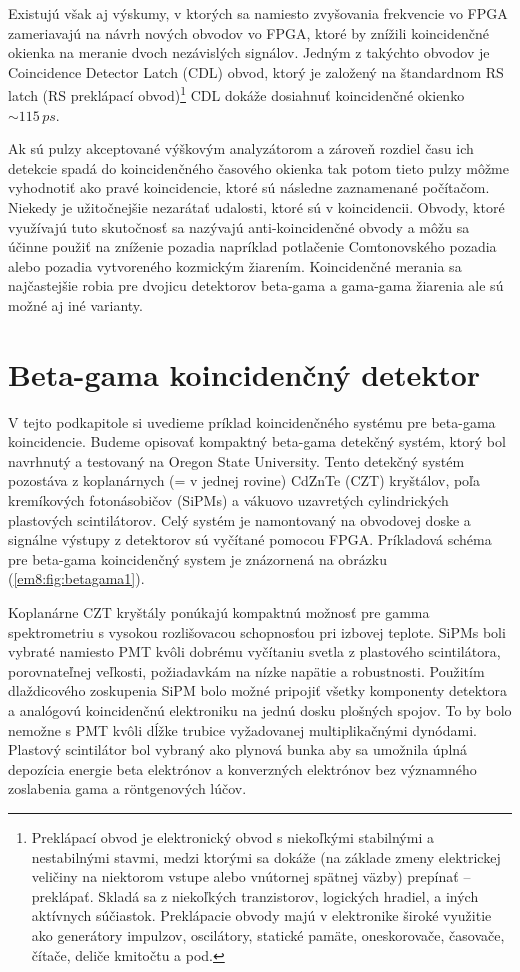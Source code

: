 \documentclass[../../main.tex]{subfiles}
\begin{document}
Existujú však aj výskumy, v ktorých sa namiesto zvyšovania frekvencie vo FPGA zameriavajú na návrh nových obvodov vo FPGA, ktoré by znížili koincidenčné okienka na meranie dvoch nezávislých signálov. Jedným z takýchto obvodov je Coincidence Detector Latch (CDL) obvod, ktorý je založený na štandardnom RS latch (RS preklápací obvod)\footnote{Preklápací obvod je elektronický obvod s niekoľkými stabilnými a nestabilnými stavmi, medzi ktorými sa dokáže (na základe zmeny elektrickej veličiny na niektorom vstupe alebo vnútornej spätnej väzby) prepínať – preklápať. Skladá sa z niekoľkých tranzistorov, logických hradiel, a iných aktívnych súčiastok. Preklápacie obvody majú v elektronike široké využitie ako generátory impulzov, oscilátory, statické pamäte, oneskorovače, časovače, čítače, deliče kmitočtu a pod.} CDL dokáže dosiahnuť koincidenčné okienko $\sim 115\,ps$.

Ak sú pulzy akceptované výškovým analyzátorom a zároveň rozdiel času ich detekcie spadá do koincidenčného časového okienka tak potom tieto pulzy môžme vyhodnotiť ako pravé koincidencie, ktoré sú následne zaznamenané počítačom. Niekedy je užitočnejšie nezarátať udalosti, ktoré sú v koincidencii. Obvody, ktoré využívajú tuto skutočnosť sa nazývajú anti-koincidenčné obvody a môžu sa účinne použiť na zníženie pozadia napríklad potlačenie Comtonovského pozadia alebo pozadia vytvoreného kozmickým žiarením. Koincidenčné merania sa najčastejšie robia pre dvojicu detektorov beta-gama a gama-gama žiarenia ale sú možné aj iné varianty.

\section{Beta-gama koincidenčný detektor}
V tejto podkapitole si uvedieme príklad koincidenčného systému pre beta-gama koincidencie. Budeme opisovať kompaktný beta-gama detekčný systém, ktorý bol navrhnutý a testovaný na Oregon State University. Tento detekčný systém pozostáva z koplanárnych (= v jednej rovine) CdZnTe (CZT) kryštálov, poľa kremíkových fotonásobičov (SiPMs) a vákuovo uzavretých cylindrických plastových scintilátorov. Celý systém je namontovaný na obvodovej doske a signálne výstupy z detektorov sú vyčítané pomocou FPGA. Príkladová schéma pre beta-gama koincidenčný system je znázornená na obrázku (\ref{em8:fig:betagama1}).

Koplanárne CZT kryštály ponúkajú kompaktnú možnosť pre gamma spektrometriu s vysokou rozlišovacou schopnosťou pri izbovej teplote. SiPMs boli vybraté namiesto PMT kvôli dobrému vyčítaniu svetla z plastového scintilátora, porovnateľnej veľkosti, požiadavkám na nízke napätie a robustnosti. Použitím dlaždicového zoskupenia SiPM bolo možné pripojiť všetky komponenty detektora a analógovú koincidenčnú elektroniku na jednú dosku plošných spojov. To by bolo nemožne s PMT kvôli dĺžke trubice vyžadovanej multiplikačnými dynódami. Plastový scintilátor bol vybraný ako plynová bunka aby sa umožnila úplná depozícia energie beta elektrónov a konverzných elektrónov bez významného zoslabenia gama a röntgenových lúčov.
\end{document}
